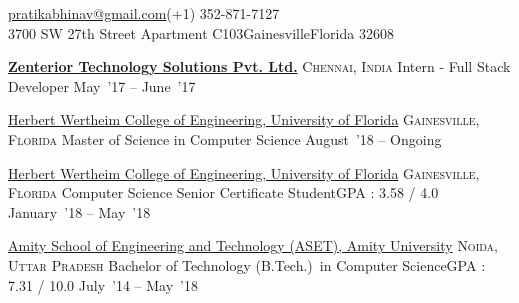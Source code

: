 \documentclass[10pt,a4paper]{article}
\begin{document}
\sloppy  %



\nobreakvspace{0.3em}  %

\noindent\href{mailto:pratikabhinav@gmail.com}{pratikabhinav\mbox{}@\mbox{}gmail.com}\sbull (+1) 352-871-7127\\
3700 SW 27th Street\sbull
Apartment C103\sbull Gainesville\sbull Florida 32608
\spacedhrule{0.5em}{-0.4em}


\headedsection  %
  {\href{}{\textbf{Zenterior Technology Solutions Pvt. Ltd.}}}
  {\textsc{Chennai, India}}
  {%
  \headedsubsection
    {Intern - Full Stack Developer}
    {May~'17 -- June~'17}
    {}
}


\headedsection
  {\href{}{Herbert Wertheim College of Engineering, University of Florida}}
  {\textsc{Gainesville, Florida}} {%
  \headedsubsection
    {Master of Science in Computer Science }
    {August~'18 -- Ongoing} {}
}

\headedsection
  {\href{}{Herbert Wertheim College of Engineering, University of Florida}}
  {\textsc{Gainesville, Florida}} {%
  \headedsubsection
    {Computer Science Senior Certificate Student\sbull GPA : 3.58 / 4.0}
    {January~'18 -- May~'18} {}
}

\headedsection
  {\href{}{Amity School of Engineering and Technology (ASET), Amity University}}
  {\textsc{Noida, Uttar Pradesh}} {%
  \headedsubsection
    {Bachelor of Technology (B.Tech.)~in Computer Science\sbull GPA : 7.31 / 10.0 }
    {July~'14 -- May~'18} {}
}
\end{document}
